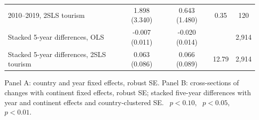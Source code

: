 \begin{table}[H]
\begin{threeparttable}
\begin{tabular}{lcccc}
2010--2019, 2SLS tourism & 1.898 (3.340) & 0.643 (1.480) & 0.35 & 120 \\
Stacked 5-year differences, OLS & -0.007 (0.011) & -0.020 (0.014) &  & 2,914 \\
Stacked 5-year differences, 2SLS tourism & 0.063 (0.086) & 0.066 (0.089) & 12.79 & 2,914 \\
\bottomrule
\end{tabular}
\begin{tablenotes}\footnotesize\item Panel A: country and year fixed effects, robust SE. Panel B: cross-sections of changes with continent fixed effects, robust SE; stacked five-year differences with year and continent effects and country-clustered SE. \sym{*}~$p<0.10$, \sym{**}~$p<0.05$, \sym{***}~$p<0.01$.\end{tablenotes}\end{threeparttable}\end{table}

